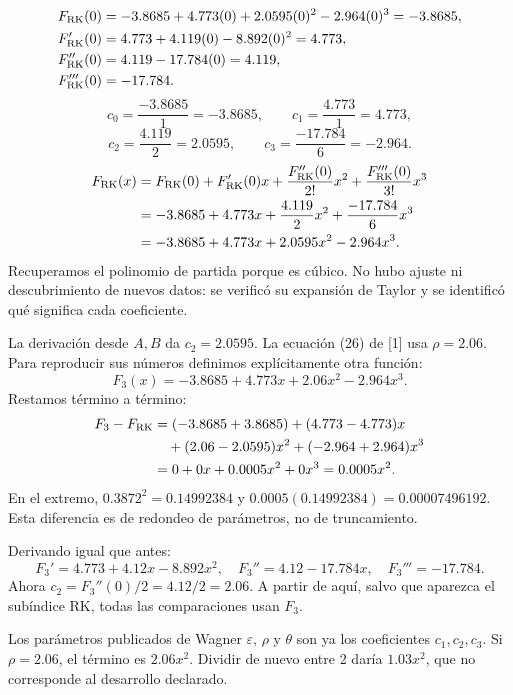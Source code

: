 \begin{align*}
F_{\mathrm{RK}}(0)&=-3.8685+4.773(0)+2.0595(0)^2-2.964(0)^3=-3.8685,\\
F_{\mathrm{RK}}'(0)&=4.773+4.119(0)-8.892(0)^2=4.773,\\
F_{\mathrm{RK}}''(0)&=4.119-17.784(0)=4.119,\\
F_{\mathrm{RK}}'''(0)&=-17.784.
\end{align*}
\[
c_0=\frac{-3.8685}{1}=-3.8685,\qquad c_1=\frac{4.773}{1}=4.773,
\]
\[
c_2=\frac{4.119}{2}=2.0595,\qquad c_3=\frac{-17.784}{6}=-2.964.
\]
\begin{align*}
F_{\mathrm{RK}}(x)&=F_{\mathrm{RK}}(0)+F_{\mathrm{RK}}'(0)x+\frac{F_{\mathrm{RK}}''(0)}{2!}x^2+\frac{F_{\mathrm{RK}}'''(0)}{3!}x^3\\
&=-3.8685+4.773x+\frac{4.119}{2}x^2+\frac{-17.784}{6}x^3\\
&=-3.8685+4.773x+2.0595x^2-2.964x^3.
\end{align*}
Recuperamos el polinomio de partida porque es cúbico. No hubo ajuste ni descubrimiento de nuevos datos: se verificó su expansión de Taylor y se identificó qué significa cada coeficiente.

La derivación desde $A,B$ da $c_2=2.0595$. La ecuación (26) de [1] usa $\rho=2.06$. Para reproducir sus números definimos explícitamente otra función:
\[
F_3(x)=-3.8685+4.773x+2.06x^2-2.964x^3.
\]
Restamos término a término:
\begin{align*}
F_3-F_{\mathrm{RK}}&=(-3.8685+3.8685)+(4.773-4.773)x\\
&\quad +(2.06-2.0595)x^2+(-2.964+2.964)x^3\\
&=0+0x+0.0005x^2+0x^3=0.0005x^2.
\end{align*}
En el extremo, $0.3872^2=0.14992384$ y $0.0005(0.14992384)=0.00007496192$. Esta diferencia es de redondeo de parámetros, no de truncamiento.

Derivando igual que antes:
\[
F_3'=4.773+4.12x-8.892x^2,\quad F_3''=4.12-17.784x,\quad F_3'''=-17.784.
\]
Ahora $c_2=F_3''(0)/2=4.12/2=2.06$. A partir de aquí, salvo que aparezca el subíndice RK, todas las comparaciones usan $F_3$.

Los parámetros publicados de Wagner $\varepsilon$, $\rho$ y $\theta$ son ya los coeficientes $c_1,c_2,c_3$. Si $\rho=2.06$, el término es $2.06x^2$. Dividir de nuevo entre 2 daría $1.03x^2$, que no corresponde al desarrollo declarado.

